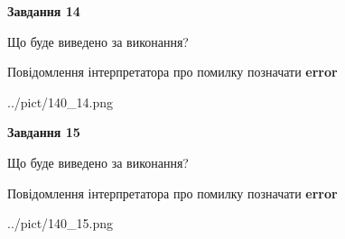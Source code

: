 \documentclass[11pt, ukrainian]{article}
\begin{document}
{\begin {large}
{\begin {center}\textbf{Завдання 14}\end {center}}\par
Що буде виведено за виконання? \par
Повідомлення інтерпретатора про помилку позначати \textbf{error}

\begin{center}
	{../pict/140_14.png}
\end{center}
\newpage

{\begin {center}\textbf{Завдання 15}\end {center}}\par
Що буде виведено за виконання? \par
Повідомлення інтерпретатора про помилку позначати \textbf{error}

\begin{center}
	{../pict/140_15.png}
\end{center}
\newpage

\end {large}}
\end{document}
